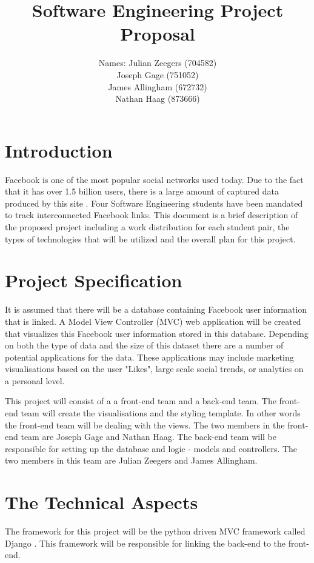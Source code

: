 \documentclass[10pt,onecolumn]{article}
\title{\vspace{-4.2cm}Software Engineering Project Proposal }
\author{ Names: Julian Zeegers (704582) \\  Joseph Gage (751052)\\James Allingham (672732) \\ Nathan Haag (873666) }
\begin{document}
\maketitle
\pagestyle{plain}
\setcounter{page}{1}


\section{Introduction}
Facebook is one of the most popular social networks used today. Due to the fact that it has over 1.5 billion users, there is a large amount of captured data produced by this site \cite{fb}. Four Software Engineering students have been mandated to track interconnected Facebook links. This document is a brief description of the proposed project including a work distribution for each student pair, the types of technologies that will be utilized and the overall plan for this project.

\section{Project Specification}
It is assumed that there will be a database containing Facebook user information that is linked. A Model View Controller (MVC) web application will be created that visualizes this Facebook user information stored in this database. Depending on both the type of data and the size of this dataset there are a number of potential applications for the data. These applications may include marketing visualisations based on the user "Likes", large scale social trends, or analytics on a personal level. 

This project will consist of a a front-end team and a back-end team. The front-end team will create the visualisations and the styling template. In other words the front-end team will be dealing with the views. The two members in the front-end team are Joseph Gage and Nathan Haag. The back-end team will be responsible for setting up the database and logic - models and controllers. The two members in this team are Julian Zeegers and James Allingham.

\section{The Technical Aspects}
The framework for this project will be the python driven MVC framework called Django \cite{django}. This framework will be responsible for linking the back-end to the front-end.
\end{document}
